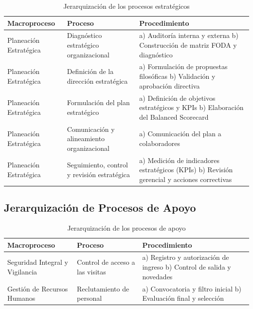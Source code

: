\documentclass[11pt, a4paper, oneside]{report}
\begin{document}
\begin{table}[H]
\centering\small
\renewcommand{\arraystretch}{1.3}
\begin{tabularx}{\textwidth}{|>{\raggedright\arraybackslash}p{}|>{\raggedright\arraybackslash}p{}|>{\raggedright\arraybackslash}X|}
\hline
\rowcolor{upeu_dark}
\color{white}\bfseries Macroproceso & \color{white}\bfseries Proceso & \color{white}\bfseries Procedimiento \\ \hline
Planeación Estratégica & Diagnóstico estratégico organizacional & a) Auditoría interna y externa \newline b) Construcción de matriz FODA y diagnóstico \\ \hline
\rowcolor{gray!10}
Planeación Estratégica & Definición de la dirección estratégica & a) Formulación de propuestas filosóficas \newline b) Validación y aprobación directiva \\ \hline
Planeación Estratégica & Formulación del plan estratégico & a) Definición de objetivos estratégicos y KPIs \newline b) Elaboración del Balanced Scorecard \\ \hline
\rowcolor{gray!10}
Planeación Estratégica & Comunicación y alineamiento organizacional & a) Comunicación del plan a colaboradores \\ \hline
Planeación Estratégica & Seguimiento, control y revisión estratégica & a) Medición de indicadores estratégicos (KPIs) \newline b) Revisión gerencial y acciones correctivas \\ \hline
\end{tabularx}
\caption{Jerarquización de los procesos estratégicos}
\end{table}

\subsection{Jerarquización de Procesos de Apoyo}

\begin{table}[H]
\centering\small
\renewcommand{\arraystretch}{1.3}
\begin{tabularx}{\textwidth}{|>{\raggedright\arraybackslash}p{}|>{\raggedright\arraybackslash}p{}|>{\raggedright\arraybackslash}X|}
\hline
\rowcolor{upeu_dark}
\color{white}\bfseries Macroproceso & \color{white}\bfseries Proceso & \color{white}\bfseries Procedimiento \\ \hline
Seguridad Integral y Vigilancia & Control de acceso a las visitas & a) Registro y autorización de ingreso \newline b) Control de salida y novedades \\ \hline
\rowcolor{gray!10}
Gestión de Recursos Humanos & Reclutamiento de personal & a) Convocatoria y filtro inicial \newline b) Evaluación final y selección \\ \hline
\end{tabularx}
\caption{Jerarquización de los procesos de apoyo}
\end{table}
\end{document}
